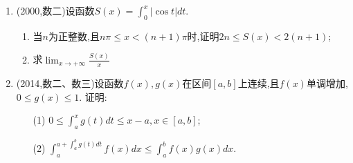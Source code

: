 \documentclass[12pt, a4paper, oneside, UTF8]{ctexbook}
\begin{document}
\begin{enumerate}[label=\arabic*.,start=21]
    \item (2000,数二)设函数$S(x)=\int_0^x|\cos t| dt$.
    \begin{enumerate}[label=(\roman*)]
        \item 当$n$为正整数,且$n\pi\leq x<(n+1)\pi$时,证明$2n\leq S(x)<2(n+1)$;
        \item 求$\lim_{x\to+\infty}\frac{S(x)}{x}$
    \end{enumerate}
    
    \begin{solution}
    \newpage
    \end{solution}
    
    \item (2014,数二、数三)设函数$f(x), g(x)$在区间$[a, b]$上连续,且$f(x)$单调增加,$0\leq g(x)\leq 1$.
    证明:
    \begin{enumerate}[label=(\roman*)]
        \item[(1)] $0\leq\int_a^x g(t) dt\leq x-a, x\in[a, b]$;
        \item[(2)] $\int_a^{a+\int_a^b g(t) dt} f(x) dx\leq\int_a^b f(x) g(x) dx$.
    \end{enumerate}
    
    \begin{solution}
    \newpage
    \end{solution}
\end{enumerate}

\ifx\allfiles\undefined
\end{document}
